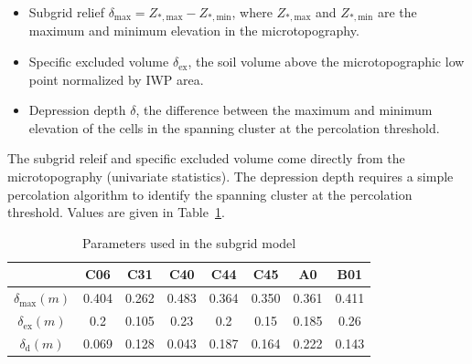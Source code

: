 \documentclass[review,11pt]{elsarticle}
\begin{document}
\begin{itemize}
\item Subgrid relief $\delta_\text{max} = Z_{*,\text{max}} -   Z_{*,\text{min}}$, where  $Z_{*,\text{max}}$ and  $Z_{*,\text{min}}$ are the maximum and minimum elevation in the microtopography. 
\item Specific excluded volume $\delta_\text{ex}$, the soil volume above the microtopographic low point normalized by IWP area.
\item Depression depth $\delta$, the difference between the maximum and minimum elevation of the cells in the spanning cluster at the percolation threshold.
\end{itemize}
The subgrid releif and specific excluded volume come directly from the microtopography (univariate statistics). The depression depth requires a simple percolation algorithm to identify the spanning cluster at the percolation threshold. Values are given in Table~\ref{subgrid-para}.

\begin{center}
\begin{table}[htbp]
\caption{Parameters used in the subgrid model}\label{subgrid-para}
\begin{tabular}{| c |c|c|c|c|c|c|c|}
\hline
& C06 & C31 & C40 & C44 & C45 & A0 & B01 \\ \hline
 $\delta_\text{max}(m)$ & 0.404 & 0.262 & 0.483 & 0.364 & 0.350 & 0.361 & 0.411 \\ \hline
$\delta_\text{ex}(m)$ & 0.2 & 0.105 & 0.23 & 0.2 & 0.15 & 0.185 & 0.26\\ \hline
$ \delta_\text{d}(m)$ & 0.069 & 0.128 & 0.043 & 0.187 & 0.164 & 0.222 & 0.143 \\ \hline
\end{tabular}

\end{table}
\end{center}
\end{document}
